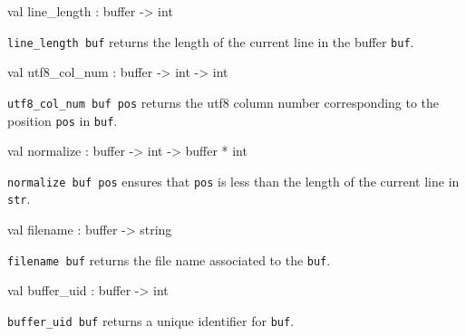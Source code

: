 \documentclass[11pt]{article}
\begin{document}
\label{val:Input.line-underscorelength}\begin{ocamldoccode}
val line_length : buffer -> int
\end{ocamldoccode}
\begin{ocamldocdescription}
{\tt{line\_length buf}} returns the length of  the  current  line  in  the
    buffer {\tt{buf}}.


\end{ocamldocdescription}




\label{val:Input.utf8-underscorecol-underscorenum}\begin{ocamldoccode}
val utf8_col_num : buffer -> int -> int
\end{ocamldoccode}
\begin{ocamldocdescription}
{\tt{utf8\_col\_num buf pos}} returns the utf8 column number  corresponding
    to the position {\tt{pos}} in {\tt{buf}}.


\end{ocamldocdescription}




\label{val:Input.normalize}\begin{ocamldoccode}
val normalize : buffer -> int -> buffer * int
\end{ocamldoccode}
\begin{ocamldocdescription}
{\tt{normalize buf pos}} ensures that {\tt{pos}} is less than  the  length  of
    the current line in {\tt{str}}.


\end{ocamldocdescription}




\label{val:Input.filename}\begin{ocamldoccode}
val filename : buffer -> string
\end{ocamldoccode}
\begin{ocamldocdescription}
{\tt{filename buf}} returns the file name associated to the {\tt{buf}}.


\end{ocamldocdescription}




\label{val:Input.buffer-underscoreuid}\begin{ocamldoccode}
val buffer_uid : buffer -> int
\end{ocamldoccode}
\begin{ocamldocdescription}
{\tt{buffer\_uid buf}} returns a unique identifier for {\tt{buf}}.


\end{ocamldocdescription}
\end{document}
